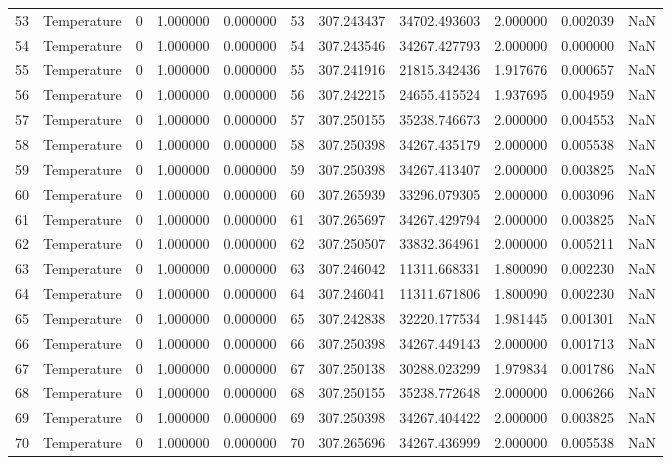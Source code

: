 \begin{tabular}{llrrrrrrrrr}
53 & Temperature & 0 & 1.000000 & 0.000000 & 53 & 307.243437 & 34702.493603 & 2.000000 & 0.002039 & NaN \\
54 & Temperature & 0 & 1.000000 & 0.000000 & 54 & 307.243546 & 34267.427793 & 2.000000 & 0.000000 & NaN \\
55 & Temperature & 0 & 1.000000 & 0.000000 & 55 & 307.241916 & 21815.342436 & 1.917676 & 0.000657 & NaN \\
56 & Temperature & 0 & 1.000000 & 0.000000 & 56 & 307.242215 & 24655.415524 & 1.937695 & 0.004959 & NaN \\
57 & Temperature & 0 & 1.000000 & 0.000000 & 57 & 307.250155 & 35238.746673 & 2.000000 & 0.004553 & NaN \\
58 & Temperature & 0 & 1.000000 & 0.000000 & 58 & 307.250398 & 34267.435179 & 2.000000 & 0.005538 & NaN \\
59 & Temperature & 0 & 1.000000 & 0.000000 & 59 & 307.250398 & 34267.413407 & 2.000000 & 0.003825 & NaN \\
60 & Temperature & 0 & 1.000000 & 0.000000 & 60 & 307.265939 & 33296.079305 & 2.000000 & 0.003096 & NaN \\
61 & Temperature & 0 & 1.000000 & 0.000000 & 61 & 307.265697 & 34267.429794 & 2.000000 & 0.003825 & NaN \\
62 & Temperature & 0 & 1.000000 & 0.000000 & 62 & 307.250507 & 33832.364961 & 2.000000 & 0.005211 & NaN \\
63 & Temperature & 0 & 1.000000 & 0.000000 & 63 & 307.246042 & 11311.668331 & 1.800090 & 0.002230 & NaN \\
64 & Temperature & 0 & 1.000000 & 0.000000 & 64 & 307.246041 & 11311.671806 & 1.800090 & 0.002230 & NaN \\
65 & Temperature & 0 & 1.000000 & 0.000000 & 65 & 307.242838 & 32220.177534 & 1.981445 & 0.001301 & NaN \\
66 & Temperature & 0 & 1.000000 & 0.000000 & 66 & 307.250398 & 34267.449143 & 2.000000 & 0.001713 & NaN \\
67 & Temperature & 0 & 1.000000 & 0.000000 & 67 & 307.250138 & 30288.023299 & 1.979834 & 0.001786 & NaN \\
68 & Temperature & 0 & 1.000000 & 0.000000 & 68 & 307.250155 & 35238.772648 & 2.000000 & 0.006266 & NaN \\
69 & Temperature & 0 & 1.000000 & 0.000000 & 69 & 307.250398 & 34267.404422 & 2.000000 & 0.003825 & NaN \\
70 & Temperature & 0 & 1.000000 & 0.000000 & 70 & 307.265696 & 34267.436999 & 2.000000 & 0.005538 & NaN \\

\end{tabular}
